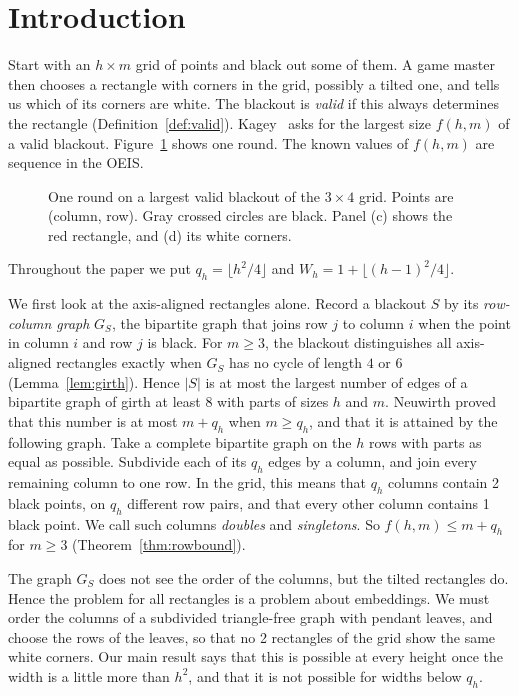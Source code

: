 \section{Introduction}\label{sec:intro}

Start with an $h\times m$ grid of points and black out some of them. A game master then
chooses a rectangle with corners in the grid, possibly a tilted one, and tells us which of
its corners are white. The blackout is \emph{valid} if this always determines the rectangle
(Definition~\ref{def:valid}). Kagey~\cite{kagey001} asks for the largest size
$f(h,m)$ of a valid blackout. Figure~\ref{fig:game} shows one round. The known values of
$f(h,m)$ are sequence  in the OEIS.

\begin{figure}[ht]
\centering
\resizebox{0.5\textwidth}{!}{}
\caption{One round on a largest valid blackout of the $3\times4$ grid. Points are
(column, row). Gray crossed circles are black. Panel (c) shows the red rectangle, and (d)
its white corners.}
\label{fig:game}
\end{figure}

Throughout the paper we put $q_h=\lfloor h^2/4\rfloor$ and
$W_h=1+\lfloor (h-1)^2/4\rfloor$.

We first look at the axis-aligned rectangles alone. Record a blackout $S$ by its
\emph{row-column graph} $G_S$, the bipartite graph that joins row $j$ to column $i$ when
the point in column $i$ and row $j$ is black. For $m\ge3$, the blackout distinguishes all
axis-aligned rectangles exactly when $G_S$ has no cycle of length $4$ or $6$
(Lemma~\ref{lem:girth}). Hence $|S|$ is at most the largest number of edges of a bipartite
graph of girth at least $8$ with parts of sizes $h$ and $m$. Neuwirth
\cite[Theorem~1(ii) and Proposition~17]{neuwirth2001} proved that this number is at most
$m+q_h$ when $m\ge q_h$, and that it is attained by the following graph. Take a complete
bipartite graph on the $h$ rows with parts as equal as possible. Subdivide each of its
$q_h$ edges by a column, and join every remaining column to one row. In the grid, this
means that $q_h$ columns contain 2 black points, on $q_h$ different row pairs, and that
every other column contains 1 black point. We call such columns \emph{doubles} and
\emph{singletons}. So $f(h,m)\le m+q_h$ for $m\ge3$ (Theorem~\ref{thm:rowbound}).

The graph $G_S$ does not see the order of the columns, but the tilted rectangles do. Hence
the problem for all rectangles is a problem about embeddings. We must order the columns of
a subdivided triangle-free graph with pendant leaves, and choose the rows of the leaves, so
that no 2 rectangles of the grid show the same white corners. Our main result says that
this is possible at every height once the width is a little more than $h^2$, and that it
is not possible for widths below $q_h$.

